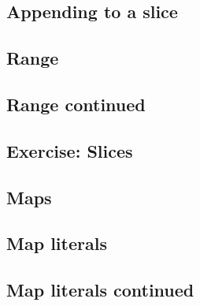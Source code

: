 \subsection{Appending to a slice}




\subsection{Range}




\subsection{Range continued}




\subsection{Exercise: Slices}


% 

\subsection{Maps}




\subsection{Map literals}




\subsection{Map literals continued}





